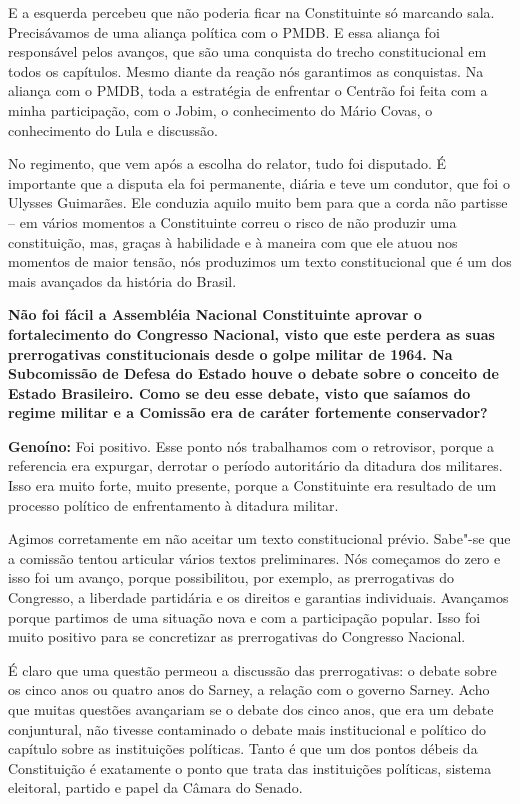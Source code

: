 E a esquerda percebeu que não poderia ficar na Constituinte só marcando
sala. Precisávamos de uma aliança política com o PMDB. E essa aliança
foi responsável pelos avanços, que são uma conquista do trecho
constitucional em todos os capítulos. Mesmo diante da reação nós
garantimos as conquistas. Na aliança com o PMDB, toda a estratégia de
enfrentar o Centrão foi feita com a minha participação, com o Jobim, o
conhecimento do Mário Covas, o conhecimento do Lula e discussão.

No regimento, que vem após a escolha do relator, tudo foi disputado. É
importante que a disputa ela foi permanente, diária e teve um condutor,
que foi o Ulysses Guimarães. Ele conduzia aquilo muito bem para que a
corda não partisse -- em vários momentos a Constituinte correu o risco
de não produzir uma constituição, mas, graças à habilidade e à maneira
com que ele atuou nos momentos de maior tensão, nós produzimos um texto
constitucional que é um dos mais avançados da história do Brasil.

\textbf{Não foi fácil a Assembléia Nacional Constituinte aprovar o
fortalecimento do Congresso Nacional, visto que este perdera as suas
prerrogativas constitucionais desde o golpe militar de 1964. Na
Subcomissão de Defesa do Estado houve o debate sobre o conceito de
Estado Brasileiro. Como se deu esse debate, visto que saíamos do regime
militar e a Comissão era de caráter fortemente conservador?}

\textbf{Genoíno:} Foi positivo. Esse ponto nós trabalhamos com o
retrovisor, porque a referencia era expurgar, derrotar o período
autoritário da ditadura dos militares. Isso era muito forte, muito
presente, porque a Constituinte era resultado de um processo político de
enfrentamento à ditadura militar.

Agimos corretamente em não aceitar um texto constitucional prévio.
Sabe"-se que a comissão tentou articular vários textos preliminares. Nós
começamos do zero e isso foi um avanço, porque possibilitou, por
exemplo, as prerrogativas do Congresso, a liberdade partidária e os
direitos e garantias individuais. Avançamos porque partimos de uma
situação nova e com a participação popular. Isso foi muito positivo para
se concretizar as prerrogativas do Congresso Nacional.

É claro que uma questão permeou a discussão das prerrogativas: o debate
sobre os cinco anos ou quatro anos do Sarney, a relação com o governo
Sarney. Acho que muitas questões avançariam se o debate dos cinco anos,
que era um debate conjuntural, não tivesse contaminado o debate mais
institucional e político do capítulo sobre as instituições políticas.
Tanto é que um dos pontos débeis da Constituição é exatamente o ponto
que trata das instituições políticas, sistema eleitoral, partido e papel
da Câmara do Senado.

